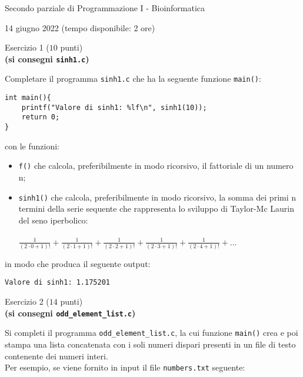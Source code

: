 \documentclass[12pt]{article}
\newcommand\ddfrac[2]{\frac{\displaystyle #1}{\displaystyle #2}}
\begin{document}
\begin{center}{\LARGE Secondo parziale di Programmazione I - Bioinformatica}\\
\begin{center}
  \large 14 giugno 2022 (tempo disponibile: 2 ore)
\end{center}
\end{center}


\vspace{8ex}
\begin{center}{\Large Esercizio 1} ($10$ punti)\\
  \textbf{(si consegni \texttt{sinh1.c})}
\end{center}
Completare il programma \texttt{sinh1.c} che ha la seguente funzione \texttt{main()}:
\begin{lstlisting}[language=myC]
int main(){
    printf("Valore di sinh1: %lf\n", sinh1(10));
    return 0;
}
\end{lstlisting}
con le funzioni:
\begin{itemize}
\item \texttt{f()} che calcola, preferibilmente in modo ricorsivo, il fattoriale di un numero n;
\item \texttt{sinh1()} che calcola, preferibilmente in modo ricorsivo, la somma dei primi n termini della serie sequente che rappresenta lo sviluppo di Taylor-Mc Laurin del seno iperbolico:\\
\\
$ \ddfrac{1}{(2\cdot0 + 1)!} + \ddfrac{1}{(2\cdot1 + 1)!} + \ddfrac{1}{(2\cdot2 + 1)!} + \ddfrac{1}{(2\cdot3 + 1)!} + \ddfrac{1}{(2\cdot4 + 1)!} + \dots $

\end{itemize}
in modo che produca il seguente output:

\begin{mdframed}[backgroundcolor=verylightgray] 
\begin{verbatim}
Valore di sinh1: 1.175201
\end{verbatim}
\end{mdframed}

\newpage
\begin{center}{\Large Esercizio 2} ($14$ punti)\\
  \textbf{(si consegni \texttt{odd\_element\_list.c})}
\end{center}
Si completi il programma \texttt{odd\_element\_list.c}, la cui funzione \texttt{main()} crea e poi stampa una lista concatenata con i soli numeri dispari presenti in un file di testo contenente dei numeri interi.
\\
Per esempio, se viene fornito in input il file \texttt{numbers.txt} seguente:
\end{document}
